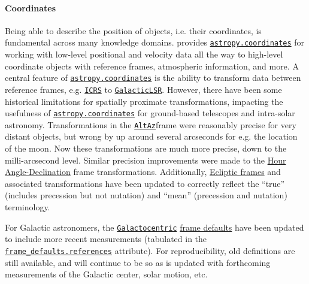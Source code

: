 \documentclass[modern]{aastex631}
\newcommand{\astropysubpkg}[1]{\href{http://docs.astropy.org/en/stable/#1/index.html}{\texttt{astropy.#1}}\xspace}
\newcommand{\astropycoordinates}{\astropysubpkg{coordinates}}
\newcommand{\astropyapi}[2]{\href{https://docs.astropy.org/en/stable/api/astropy.#1.html}{#2}}
\newcommand{\astropyapidoc}[2]{\astropyapi{#1}{\texttt{#2}\xspace}}
\newcommand{\astropyICRS}{\astropyapidoc{coordinates.builtin_frames.ICRS}{ICRS}}
\newcommand{\astropyGalacticLSR}{\astropyapidoc{coordinates.builtin_frames.
GalacticLSR}{GalacticLSR}}
\newcommand{\astropyAltAz}{\astropyapidoc{coordinates.builtin_frames.AltAz}{AltAz}}
\newcommand{\astropyGalactocentric}{\astropyapidoc{coordinates.builtin_frames.Galactocentric}{Galactocentric}}
\newcommand{\astropyScienceState}{\astropyapidoc{utils.state.ScienceState}{ScienceState}}
\begin{document}
  \paragraph{Coordinates}

    Being able to describe the position of objects, i.e. their coordinates, is
    fundamental across many knowledge domains. \astropypkg provides
    \astropycoordinates for working with low-level positional and velocity data
    all the way to high-level coordinate objects with reference frames,
    atmospheric information, and more. A central feature of \astropycoordinates is
    the ability to transform data between reference frames, e.g. \astropyICRS
    \citep{ICRS:1997} to \astropyGalacticLSR \citep{GalacticLSR:2010}. However,
    there have been some historical limitations for spatially proximate
    transformations, impacting the usefulness of \astropycoordinates for
    ground-based telescopes and intra-solar astronomy. Transformations in the
    \astropyAltAz frame were reasonably precise for very distant objects, but
    wrong by up around several arcseconds for e.g. the location of the moon. Now
    these transformations are much more precise, down to the milli-arcsecond
    level. Similar precision improvements were made to the
    \astropyapi{coordinates.builtin_frames.HADec}{Hour Angle-Declination} frame
    transformations. Additionally,
    \astropyapi{coordinates.builtin_frames.BaseEclipticFrame}{Ecliptic frames}
    and associated transformations have been updated to correctly reflect the
    “true” (includes precession but not nutation) and “mean” (precession and
    nutation) terminology.

    For Galactic astronomers, the \astropyGalactocentric
    \astropyapi{coordinates.galactocentric_frame_defaults}{frame defaults} have
    been updated to include more recent measurements (tabulated in the
    \href{https://docs.astropy.org/en/stable/api/astropy.coordinates.galactocentric_frame_defaults.html#astropy.coordinates.galactocentric_frame_defaults.references}{\texttt{frame\_defaults.references}}
    attribute). For reproducibility, old definitions are still available, and will
    continue to be so as \astropypkg is updated with forthcoming measurements of
    the Galactic center, solar motion, etc.
\end{document}
